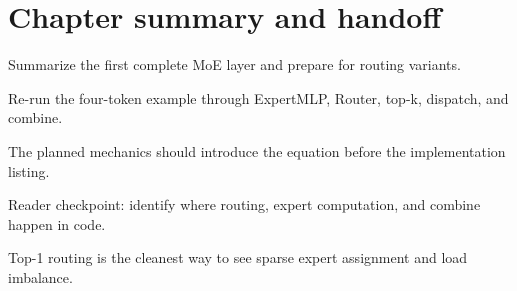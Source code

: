 \section{Chapter summary and handoff}
\label{sec:ch03-chapter-summary-and-handoff}

Summarize the first complete MoE layer and prepare for routing variants.



Re-run the four-token example through ExpertMLP, Router, top-k, dispatch, and combine.



The planned mechanics should introduce the equation before the implementation listing.





\begin{checkpointbox}
Reader checkpoint: identify where routing, expert computation, and combine happen in code.
\end{checkpointbox}

Top-1 routing is the cleanest way to see sparse expert assignment and load imbalance.
